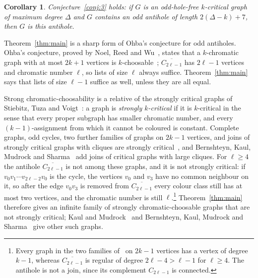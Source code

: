 \documentclass[11pt,a4paper,reqno]{amsart}
\newtheorem{corollary}[theorem]{Corollary}
\theoremstyle{definition}
\theoremstyle{remark}
\newcommand{\cbar}[1]{\overline{C_{#1}}}
\begin{document}
\begin{corollary}\label{cor:conj3}
Conjecture~\ref{conj:3} holds: if $G$ is an odd-hole-free $k$-critical graph of maximum degree $\Delta$ and $G$ contains an odd antihole of length $2(\Delta-k)+7$, then $G$ is this antihole.
\end{corollary}

Theorem~\ref{thm:main} is a sharp form of Ohba's conjecture for odd antiholes. Ohba's conjecture, proved by Noel, Reed and Wu~\cite{NRW}, states that a $k$-chromatic graph with at most $2k+1$ vertices is $k$-choosable~\cite{Ohba}; $\cbar{2\ell-1}$ has $2\ell-1$ vertices and chromatic number $\ell$, so lists of size $\ell$ always suffice. Theorem~\ref{thm:main} says that lists of size $\ell-1$ suffice as well, unless they are all equal.

Strong chromatic-choosability is a relative of the strongly critical graphs of Stiebitz, Tuza and Voigt~\cite{STV}: a graph is \emph{strongly $k$-critical} if it is $k$-critical in the sense that every proper subgraph has smaller chromatic number, and every $(k-1)$-assignment from which it cannot be coloured is constant. Complete graphs, odd cycles, two further families of graphs on $2k-1$ vertices, and joins of strongly critical graphs with cliques are strongly critical~\cite{STV}, and Bernshteyn, Kaul, Mudrock and Sharma~\cite{BKMS} add joins of critical graphs with large cliques. For $\ell\ge4$ the antihole $\cbar{2\ell-1}$ is not among these graphs, and it is not strongly critical: if $v_0v_1\cdots v_{2\ell-2}v_0$ is the cycle, the vertices $v_0$ and $v_3$ have no common neighbour on it, so after the edge $v_0v_3$ is removed from $\cbar{2\ell-1}$ every colour class still has at most two vertices, and the chromatic number is still $\ell$.\footnote{Every graph in the two families of~\cite{STV} on $2k-1$ vertices has a vertex of degree $k-1$, whereas $\cbar{2\ell-1}$ is regular of degree $2\ell-4>\ell-1$ for $\ell\ge4$. The antihole is not a join, since its complement $C_{2\ell-1}$ is connected.} Theorem~\ref{thm:main} therefore gives an infinite family of strongly chromatic-choosable graphs that are not strongly critical; Kaul and Mudrock~\cite{KM} and Bernshteyn, Kaul, Mudrock and Sharma~\cite{BKMS} give other such graphs.
\end{document}
